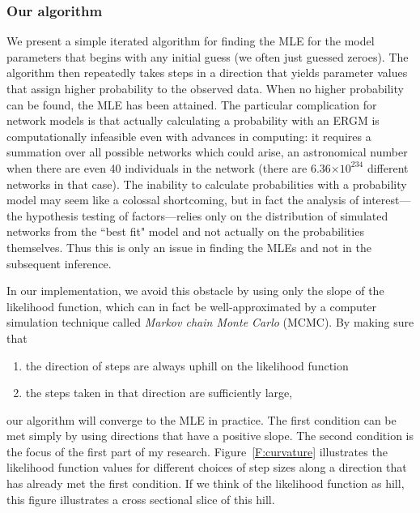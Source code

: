 \documentclass[12pt]{article}
\begin{document}

\subsubsection{Our algorithm}
We present a simple iterated algorithm for finding the MLE for the model parameters
that begins with any initial guess (we often just guessed zeroes). 
The algorithm then repeatedly takes steps in a direction that 
yields parameter values that assign higher probability to the observed data.    
When no higher probability can be found, the MLE has been attained.  
The particular complication for network models is that 
actually calculating a probability with an ERGM is computationally infeasible 
even with advances in computing: 
it requires a summation over all possible networks which could arise, 
an astronomical number when there are even 40 individuals in the network 
(there are 6.36$\times10^{234}$ different networks in that case).  
The inability to calculate probabilities with a probability model may seem 
like a colossal shortcoming, but in fact the analysis of interest---the 
hypothesis testing of factors---relies only on the distribution of simulated 
networks from the ``best fit" model and not actually on the probabilities 
themselves.  Thus this is only an issue in finding the MLEs and not in 
the subsequent inference.

In our implementation, we avoid this obstacle by using only the slope of 
the likelihood function, which can in fact be well-approximated by 
a computer simulation technique called \emph{Markov chain Monte Carlo} (MCMC).  
By making sure that
\begin{enumerate}
\item the direction of steps are always uphill on the likelihood function
\item the steps taken in that direction are sufficiently large,
\end{enumerate}
our algorithm will converge to the MLE in practice.  The first condition can be met 
simply by using directions that have a positive slope.  The second condition is the 
focus of the first part of my research.
Figure~\ref{F:curvature} illustrates the likelihood function values 
for different choices of step sizes along a direction that has already 
met the first condition.  If we think of the likelihood function as hill, this 
figure illustrates a cross sectional slice of this hill.
\end{document}
